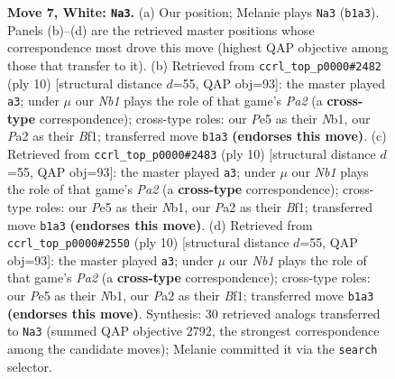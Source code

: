 \documentclass[11pt]{article}
\begin{document}
\begin{figure}[p]
\caption{\textbf{Move 7, White: \texttt{Na3}.} (a) Our position; Melanie plays \texttt{Na3} (\texttt{b1a3}). Panels (b)--(d) are the retrieved master positions whose correspondence most drove this move (highest QAP objective among those that transfer to it). (b) Retrieved from \texttt{ccrl\_top\_p0000\#2482} (ply 10) [structural distance $d$=55, QAP obj=93]: the master played \texttt{a3}; under $\mu$ our \emph{Nb1} plays the role of that game's \emph{Pa2} (a \textbf{cross-type} correspondence); cross-type roles: our \emph{P}e5 as their \emph{N}b1, our \emph{P}a2 as their \emph{B}f1; transferred move \texttt{b1a3} \textbf{(endorses this move)}. (c) Retrieved from \texttt{ccrl\_top\_p0000\#2483} (ply 10) [structural distance $d$=55, QAP obj=93]: the master played \texttt{a3}; under $\mu$ our \emph{Nb1} plays the role of that game's \emph{Pa2} (a \textbf{cross-type} correspondence); cross-type roles: our \emph{P}e5 as their \emph{N}b1, our \emph{P}a2 as their \emph{B}f1; transferred move \texttt{b1a3} \textbf{(endorses this move)}. (d) Retrieved from \texttt{ccrl\_top\_p0000\#2550} (ply 10) [structural distance $d$=55, QAP obj=93]: the master played \texttt{a3}; under $\mu$ our \emph{Nb1} plays the role of that game's \emph{Pa2} (a \textbf{cross-type} correspondence); cross-type roles: our \emph{P}e5 as their \emph{N}b1, our \emph{P}a2 as their \emph{B}f1; transferred move \texttt{b1a3} \textbf{(endorses this move)}. Synthesis: 30 retrieved analogs transferred to \texttt{Na3} (summed QAP objective 2792, the strongest correspondence among the candidate moves); Melanie committed it via the \texttt{search} selector.}
\label{fig:thought-m12}
\end{figure}

\clearpage
\end{document}
